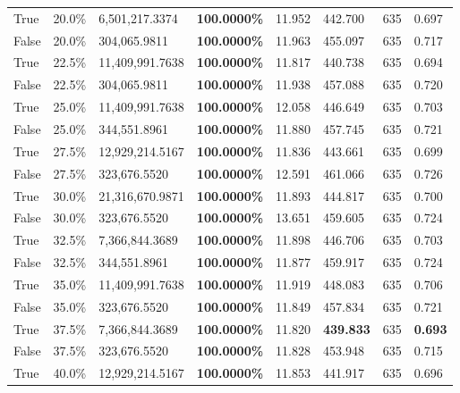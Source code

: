 \begin{table}[H]
\begin{tabular}{lllrllll}
\cline{1-8}
True & 20.0\% & 6,501,217.3374 & \bfseries \color{red} 100.0000\% & 11.952 & 442.700 & 635 & 0.697 \\
\cline{1-8}
False & 20.0\% & 304,065.9811 & \bfseries \color{red} 100.0000\% & 11.963 & 455.097 & 635 & 0.717 \\
\cline{1-8}
True & 22.5\% & 11,409,991.7638 & \bfseries \color{red} 100.0000\% & 11.817 & 440.738 & 635 & 0.694 \\
\cline{1-8}
False & 22.5\% & 304,065.9811 & \bfseries \color{red} 100.0000\% & 11.938 & 457.088 & 635 & 0.720 \\
\cline{1-8}
True & 25.0\% & 11,409,991.7638 & \bfseries \color{red} 100.0000\% & 12.058 & 446.649 & 635 & 0.703 \\
\cline{1-8}
False & 25.0\% & 344,551.8961 & \bfseries \color{red} 100.0000\% & 11.880 & 457.745 & 635 & 0.721 \\
\cline{1-8}
True & 27.5\% & 12,929,214.5167 & \bfseries \color{red} 100.0000\% & 11.836 & 443.661 & 635 & 0.699 \\
\cline{1-8}
False & 27.5\% & 323,676.5520 & \bfseries \color{red} 100.0000\% & 12.591 & 461.066 & 635 & 0.726 \\
\cline{1-8}
True & 30.0\% & 21,316,670.9871 & \bfseries \color{red} 100.0000\% & 11.893 & 444.817 & 635 & 0.700 \\
\cline{1-8}
False & 30.0\% & 323,676.5520 & \bfseries \color{red} 100.0000\% & 13.651 & 459.605 & 635 & 0.724 \\
\cline{1-8}
True & 32.5\% & 7,366,844.3689 & \bfseries \color{red} 100.0000\% & 11.898 & 446.706 & 635 & 0.703 \\
\cline{1-8}
False & 32.5\% & 344,551.8961 & \bfseries \color{red} 100.0000\% & 11.877 & 459.917 & 635 & 0.724 \\
\cline{1-8}
True & 35.0\% & 11,409,991.7638 & \bfseries \color{red} 100.0000\% & 11.919 & 448.083 & 635 & 0.706 \\
\cline{1-8}
False & 35.0\% & 323,676.5520 & \bfseries \color{red} 100.0000\% & 11.849 & 457.834 & 635 & 0.721 \\
\cline{1-8}
True & 37.5\% & 7,366,844.3689 & \bfseries \color{red} 100.0000\% & 11.820 & \bfseries \color{red} 439.833 & 635 & \bfseries \color{red} 0.693 \\
\cline{1-8}
False & 37.5\% & 323,676.5520 & \bfseries \color{red} 100.0000\% & 11.828 & 453.948 & 635 & 0.715 \\
\cline{1-8}
True & 40.0\% & 12,929,214.5167 & \bfseries \color{red} 100.0000\% & 11.853 & 441.917 & 635 & 0.696 \\

\end{tabular}
\end{table}
